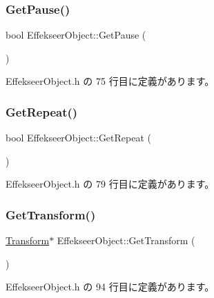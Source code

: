 \subsubsection{\texorpdfstring{Get\+Pause()}{GetPause()}}
{\footnotesize\ttfamily bool Effekseer\+Object\+::\+Get\+Pause (\begin{DoxyParamCaption}{ }\end{DoxyParamCaption})\hspace{0.3cm}{\ttfamily [inline]}}



 Effekseer\+Object.\+h の 75 行目に定義があります。

\mbox{\label{class_effekseer_object_a3c44b29c016fb5b3618e2d39060844be}} 
\subsubsection{\texorpdfstring{Get\+Repeat()}{GetRepeat()}}
{\footnotesize\ttfamily bool Effekseer\+Object\+::\+Get\+Repeat (\begin{DoxyParamCaption}{ }\end{DoxyParamCaption})\hspace{0.3cm}{\ttfamily [inline]}}



 Effekseer\+Object.\+h の 79 行目に定義があります。

\mbox{\label{class_effekseer_object_ad7e825d08856df48459437ad759d7a00}} 
\subsubsection{\texorpdfstring{Get\+Transform()}{GetTransform()}}
{\footnotesize\ttfamily \mbox{\hyperlink{class_transform}{Transform}}$\ast$ Effekseer\+Object\+::\+Get\+Transform (\begin{DoxyParamCaption}{ }\end{DoxyParamCaption})\hspace{0.3cm}{\ttfamily [inline]}}



 Effekseer\+Object.\+h の 94 行目に定義があります。

